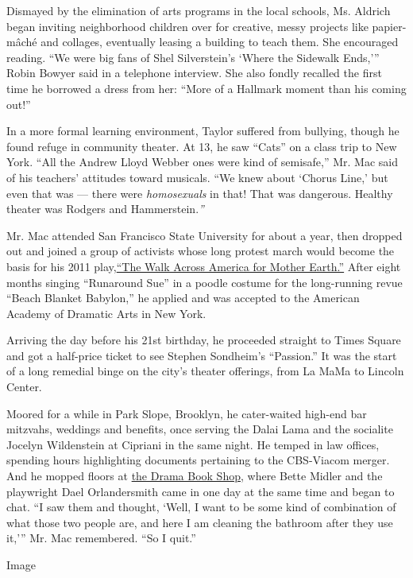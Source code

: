 Dismayed by the elimination of arts programs in the local schools, Ms.
Aldrich began inviting neighborhood children over for creative, messy
projects like papier-mâché and collages, eventually leasing a building
to teach them. She encouraged reading. ``We were big fans of Shel
Silverstein's `Where the Sidewalk Ends,''' Robin Bowyer said in a
telephone interview. She also fondly recalled the first time he borrowed
a dress from her: ``More of a Hallmark moment than his coming out!''

In a more formal learning environment, Taylor suffered from bullying,
though he found refuge in community theater. At 13, he saw ``Cats'' on a
class trip to New York. ``All the Andrew Lloyd Webber ones were kind of
semisafe,'' Mr. Mac said of his teachers' attitudes toward musicals.
``We knew about `Chorus Line,' but even that was --- there were
\emph{homosexuals} in that! That was dangerous. Healthy theater was
Rodgers and Hammerstein.\emph{''}

Mr. Mac attended San Francisco State University for about a year, then
dropped out and joined a group of activists whose long protest march
would become the basis for his 2011
play,\href{http://www.nytimes3xbfgragh.onion/2011/01/21/theater/reviews/21walk.html}{``The
Walk Across America for Mother Earth.''} After eight months singing
``Runaround Sue'' in a poodle costume for the long-running revue ``Beach
Blanket Babylon,'' he applied and was accepted to the American Academy
of Dramatic Arts in New York.

Arriving the day before his 21st birthday, he proceeded straight to
Times Square and got a half-price ticket to see Stephen Sondheim's
``Passion.'' It was the start of a long remedial binge on the city's
theater offerings, from La MaMa to Lincoln Center.

Moored for a while in Park Slope, Brooklyn, he cater-waited high-end bar
mitzvahs, weddings and benefits, once serving the Dalai Lama and the
socialite Jocelyn Wildenstein at Cipriani in the same night. He temped
in law offices, spending hours highlighting documents pertaining to the
CBS-Viacom merger. And he mopped floors at
\href{http://www.dramabookshop.com/}{the Drama Book Shop}, where Bette
Midler and the playwright Dael Orlandersmith came in one day at the same
time and began to chat. ``I saw them and thought, `Well, I want to be
some kind of combination of what those two people are, and here I am
cleaning the bathroom after they use it,''' Mr. Mac remembered. ``So I
quit.''

Image

